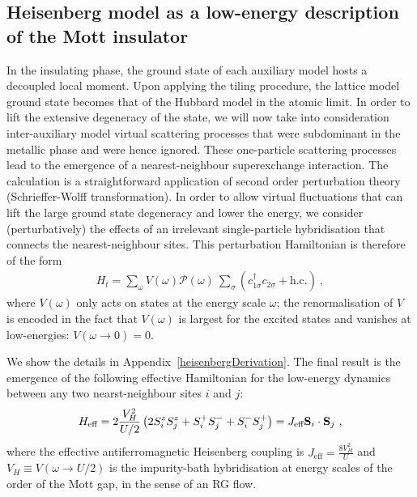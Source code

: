 \documentclass[reprint,hidelinks,onecolumn]{revtex4-2}
\begin{document}
\subsection{Heisenberg model as a low-energy description of the Mott insulator}

In the insulating phase, the ground state of each auxiliary model hosts a decoupled local moment. Upon applying the tiling procedure, the lattice model ground state becomes that of the Hubbard model in the atomic limit. In order to lift the extensive degeneracy of the state, we will now take into consideration inter-auxiliary model virtual scattering processes that were subdominant in the metallic phase and were hence ignored. These one-particle scattering processes lead to the emergence of a nearest-neighbour superexchange interaction. The calculation is a straightforward application of second order perturbation theory (Schrieffer-Wolff transformation). In order to allow virtual fluctuations that can lift the large ground state degeneracy and lower the energy, we consider (perturbatively) the effects of an irrelevant single-particle hybridisation that connects the nearest-neighbour sites. This perturbation Hamiltonian is therefore of the form
\begin{equation}\begin{aligned}
	H_t = \sum_\omega V(\omega) \mathcal{P}(\omega)~\sum_\sigma\left(c^\dagger_{1\sigma}c_{2\sigma} + \text{h.c.}\right) ~,
\end{aligned}\end{equation}
where \(V(\omega)\) only acts on states at the energy scale \(\omega\); the renormalisation of \(V\) is encoded in the fact that \(V(\omega)\) is largest for the excited states and vanishes at low-energies: \(V(\omega \to 0) = 0\).

We show the details in Appendix~\ref{heisenbergDerivation}. The final result is the emergence of the following effective Hamiltonian for the low-energy dynamics between any two nearst-neighbour sites \(i\) and \(j\):
\begin{equation}\begin{aligned}
	H_\text{eff} = 2\frac{V_H^2}{U/2}\left(2S_i^z S_j^z + S_i^+S_j^- + S_i^-S_j^+\right) = J_\text{eff} {\bf S}_i\cdot{\bf S}_j~,
\end{aligned}\end{equation}
where the effective antiferromagnetic Heisenberg coupling is \(J_\text{eff} = \frac{8V_H^2}{U}\) and \(V_H \equiv V(\omega \to U/2)\) is the impurity-bath hybridisation at energy scales of the order of the Mott gap, in the sense of an RG flow.
\end{document}
